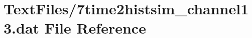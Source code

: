 \hypertarget{7time2histsim__channel13_8dat}{}\section{Text\+Files/7time2histsim\+\_\+channel13.dat File Reference}
\label{7time2histsim__channel13_8dat}
